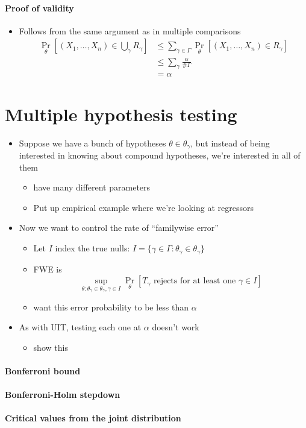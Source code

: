 \paragraph{Proof of validity}
\begin{itemize}
\item Follows from the same argument as in multiple comparisons
  \begin{align*}
    \Pr_\theta[(X_1,\dots,X_n) \in \bigcup_{\gamma} R_\gamma] 
    &\leq \sum_{\gamma \in \Gamma} \Pr_\theta[(X_1,\dots,X_n) \in R_\gamma] \\
    &\leq \sum_\gamma \frac{\alpha}{\#\Gamma} \\
    &= \alpha
  \end{align*}
\end{itemize}

\section{Multiple hypothesis testing}

\begin{itemize}[leftmargin=0pt]
\item Suppose we have a bunch of hypotheses $\theta \in \theta_\gamma$, but instead of
  being interested in knowing about compound hypotheses, we're
  interested in all of them
  \begin{itemize}
  \item have many different parameters
  \item Put up empirical example where we're looking at regressors
  \end{itemize}
\item Now we want to control the rate of ``familywise error''
  \begin{itemize}
  \item Let $I$ index the true nulls: $I = \{\gamma \in \Gamma : \theta_\gamma \in \theta_\gamma\}$
  \item FWE is \[\sup_{\theta: \theta_\gamma \in \theta_\gamma, \gamma \in I} \Pr_\theta[T_\gamma \text{ rejects
      for at least one } \gamma \in I]\]
  \item want this error probability to be less than $\alpha$
  \end{itemize}
\item As with UIT, testing each one at $\alpha$ doesn't work
  \begin{itemize}
  \item show this
  \end{itemize}
\end{itemize}

\paragraph{Bonferroni bound}

\paragraph{Bonferroni-Holm stepdown}

\paragraph{Critical values from the joint distribution}

